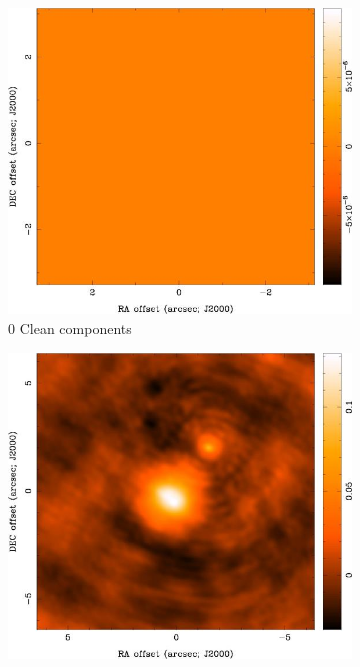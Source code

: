 \begin{figure}
        ~ %
        \begin{subfigure}[b]{0.5\textwidth}
			\centering
                \includegraphics[scale=0.6]{Figures/uv-coverage/cleanD1map}
                \caption{0 Clean components}
                \label{fig:clmap1}
        \end{subfigure}%
        \begin{subfigure}[b]{0.5\textwidth}
		\centering                
                \includegraphics[scale=0.6]{Figures/uv-coverage/cleanD1res}

\end{subfigure}
\end{figure}
